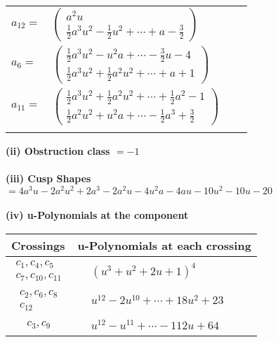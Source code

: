 \documentclass[1p]{elsarticle_modified}
\theoremstyle{definition}
\begin{document}
\begin{tabular}{m{7pt} m{180pt} m{7pt} m{180pt} }
\flushright $a_{12}=$&$\begin{pmatrix}a^2 u\\\frac{1}{2} a^3 u^2-\frac{1}{2} u^2+\cdots+a-\frac{3}{2}\end{pmatrix}$ \\
\flushright $a_{6}=$&$\begin{pmatrix}\frac{1}{2} a^3 u^2- u^2 a+\cdots-\frac{3}{2} u-4\\\frac{1}{2} a^3 u^2+\frac{1}{2} a^2 u^2+\cdots+a+1\end{pmatrix}$ \\
\flushright $a_{11}=$&$\begin{pmatrix}\frac{1}{2} a^3 u^2+\frac{1}{2} a^2 u^2+\cdots+\frac{1}{2} a^2-1\\\frac{1}{2} a^2 u^2+u^2 a+\cdots-\frac{1}{2} a^3+\frac{3}{2}\end{pmatrix}$\\&\end{tabular}
\flushleft \textbf{(ii) Obstruction class $= -1$}\\~\\
\flushleft \textbf{(iii) Cusp Shapes $= 4 a^3 u-2 a^2 u^2+2 a^3-2 a^2 u-4 u^2 a-4 a u-10 u^2-10 u-20$}\\~\\
\newpage\renewcommand{\arraystretch}{1}
\flushleft \textbf{(iv) u-Polynomials at the component}\newline \\
\begin{tabular}{m{50pt}|m{274pt}}
Crossings & \hspace{64pt}u-Polynomials at each crossing \\
\hline $$\begin{aligned}c_{1},c_{4},c_{5}\\c_{7},c_{10},c_{11}\end{aligned}$$&$\begin{aligned}
&(u^3+u^2+2 u+1)^4
\end{aligned}$\\
\hline $$\begin{aligned}c_{2},c_{6},c_{8}\\c_{12}\end{aligned}$$&$\begin{aligned}
&u^{12}-2 u^{10}+\cdots+18 u^2+23
\end{aligned}$\\
\hline $$\begin{aligned}c_{3},c_{9}\end{aligned}$$&$\begin{aligned}
&u^{12}- u^{11}+\cdots-112 u+64
\end{aligned}$\\
\hline
\end{tabular}\\~\\
\end{document}
